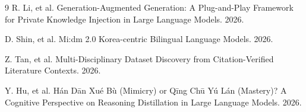 \documentclass{article}
\begin{document}
\begin{thebibliography}{9}
R. Li, et al. Generation-Augmented Generation: A Plug-and-Play Framework for Private Knowledge Injection in Large Language Models. 2026.

D. Shin, et al. Mi:dm 2.0 Korea-centric Bilingual Language Models. 2026.

Z. Tan, et al. Multi-Disciplinary Dataset Discovery from Citation-Verified Literature Contexts. 2026.

Y. Hu, et al. H\'an D\=an Xu\'e B\`u (Mimicry) or Q\=ing Ch\=u Y\'u L\'an (Mastery)? A Cognitive Perspective on Reasoning Distillation in Large Language Models. 2026.

\end{thebibliography}
\end{document}
